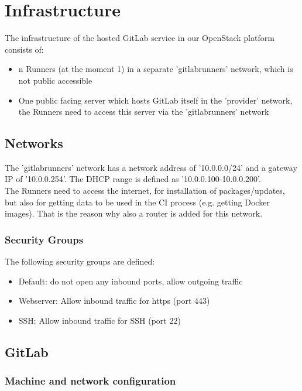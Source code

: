 \chapter{Infrastructure}

The infrastructure of the hosted GitLab service in our OpenStack platform consists of:
\begin{itemize}
    \item n Runners (at the moment 1) in a separate 'gitlabrunners' network, which is not public accessible
    \item One public facing server which hosts GitLab itself in the 'provider' network,
          the Runners need to access this server via the 'gitlabrunners' network
\end{itemize}

\section{Networks}

The 'gitlabrunners' network has a network address of '10.0.0.0/24' and a gateway IP of '10.0.0.254'.
The DHCP range is defined as '10.0.0.100-10.0.0.200'.\\

The Runners need to access the internet, for installation of packages/updates, but also for getting data to be used in the CI process (e.g. getting Docker images). 
That is the reason why also a router is added for this network.

\subsection{Security Groups}

The following security groups are defined:
\begin{itemize}
    \item Default: do not open any inbound ports, allow outgoing traffic
    \item Webserver: Allow inbound traffic for https (port 443)
	\item SSH: Allow inbound traffic for SSH (port 22)
\end{itemize}

\section{GitLab}

\subsection{Machine and network configuration}

